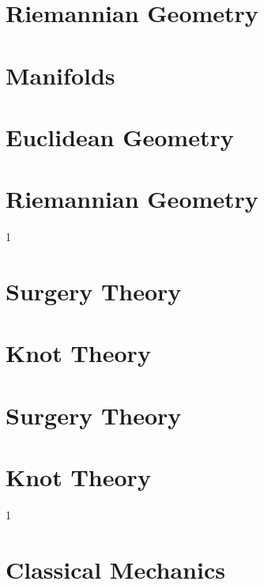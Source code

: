 \documentclass{book}                                                           %
\newcommand*{\TOPPATH}{books}
\newcommand*{\PATH}{\TOPPATH/}
\newcounter{endpage}
\def\compilegeotop{1}
\def\compilephysics{1}
\begin{document}
        \part{Riemannian Geometry}
            
    \else
        \part{Manifolds}
        \part{Euclidean Geometry}
        \part{Riemannian Geometry}
    \fi
    \clearpage

    \setcounter{endpage}{\thepage}
    \label{book:Geometric_Topology}%
    \renewcommand{\PATH}{\TOPPATH/Geometric_Topology}
    \setcounter{page}{\value{endpage}}

    \if\compilegeotop1
        \part{Surgery Theory}
            
        \part{Knot Theory}
            
    \else
        \part{Surgery Theory}
        \part{Knot Theory}
    \fi
    \clearpage

    \setcounter{endpage}{\thepage}
    \label{book:Physics}
    \renewcommand{\PATH}{\TOPPATH/Physics}
    \setcounter{page}{\value{endpage}}

    \if\compilephysics1
        \part{Classical Mechanics}
            
\end{document}
